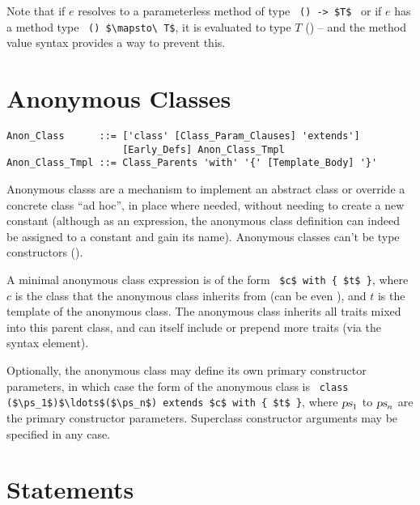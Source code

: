 Note that if $e$ resolves to a parameterless method of type ~\lstinline!() -> $T$!~ or if $e$ has a method type ~\lstinline!() $\mapsto\ T$!, it is evaluated to type $T$ () -- and the method value syntax provides a way to prevent this. 





\section{Anonymous Classes}
\label{sec:anonymous-classes}

\syntax\begin{lstlisting}
Anon_Class      ::= ['class' [Class_Param_Clauses] 'extends'] 
                    [Early_Defs] Anon_Class_Tmpl
Anon_Class_Tmpl ::= Class_Parents 'with' '{' [Template_Body] '}'
\end{lstlisting}

Anonymous classs are a mechanism to implement an abstract class or override a concrete class ``ad hoc'', in place where needed, without needing to create a new constant (although as an expression, the anonymous class definition can indeed be assigned to a constant and gain its name). Anonymous classes can't be type constructors (). 

A minimal anonymous class expression is of the form ~\lstinline!$c$ with { $t$ }!, where $c$ is the class that the anonymous class inherits from (can be even ), and $t$ is the template of the anonymous class. The anonymous class inherits all traits mixed into this parent class, and can itself include or prepend more traits (via the  syntax element). 

Optionally, the anonymous class may define its own primary constructor parameters, in which case the form of the anonymous class is ~\lstinline!class ($\ps_1$)$\ldots$($\ps_n$) extends $c$ with { $t$ }!, where $\mbox{\sl ps}_1$ to $\mbox{\sl ps}_n$ are the primary constructor parameters. Superclass constructor arguments may be specified in any case. 






\section{Statements}
\label{sec:statements}

